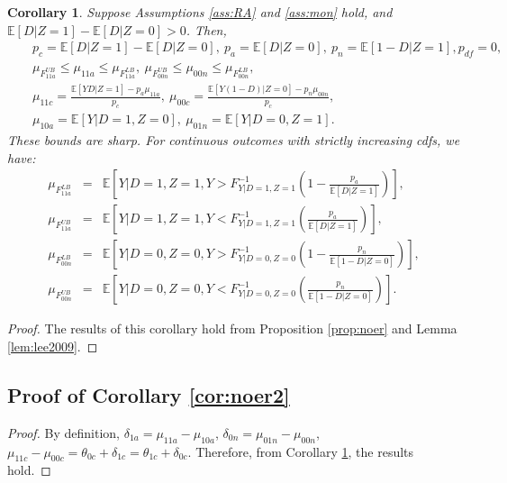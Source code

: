 \documentclass[12pt]{article}
\theoremstyle{plain}
\newtheorem{corollary}{Corollary}%
\theoremstyle{definition}
\theoremstyle{remark}
\begin{document}
\begin{corollary}\label{cor:noer1}
 Suppose Assumptions \ref{ass:RA} and \ref{ass:mon} hold, and $\mathbb{E}[D  \vert  Z=1] - \mathbb{E}[D  \vert  Z=0]> 0$. Then,
\begin{eqnarray*}
    && p_c=\mathbb{E}[D  \vert  Z=1] - \mathbb{E}[D  \vert  Z=0],\ p_a=\mathbb E[D\vert Z=0],\ p_n=\mathbb E[1-D\vert Z=1], p_{df}=0,\\
    && \mu_{F_{11a}^{UB}} \leq \mu_{11a} \leq \mu_{F_{11a}^{LB}},\ \mu_{F_{00n}^{UB}} \leq \mu_{00n} \leq \mu_{F_{00n}^{LB}},\\
    && \mu_{11c} = \frac{\mathbb E[Y D \vert Z=1]- p_a \mu_{11a}}{p_c},\  \mu_{00c} = \frac{\mathbb E[Y (1-D) \vert Z=0]- p_n \mu_{00n}}{p_c},\\
    && \mu_{10a}=\mathbb E[Y \vert D=1, Z=0],\ \mu_{01n}=\mathbb E[Y \vert D=0, Z=1]. 
\end{eqnarray*}   
These bounds are sharp. 
For continuous outcomes with strictly increasing cdfs, we have: 
\begin{eqnarray*}
\mu_{F_{11a}^{LB}} &=& \mathbb E\left[Y\vert D=1, Z=1, Y> F^{-1}_{Y\vert D=1, Z=1}\left(1-\frac{p_a}{\mathbb E[D\vert Z=1]}\right)\right],\\
\mu_{F_{11a}^{UB}} &=& \mathbb E\left[Y\vert D=1, Z=1, Y< F^{-1}_{Y\vert D=1, Z=1}\left(\frac{p_a}{\mathbb E[D\vert Z=1]}\right)\right],\\
\mu_{F_{00n}^{LB}} &=& \mathbb E\left[Y\vert D=0, Z=0, Y> F^{-1}_{Y\vert D=0, Z=0}\left(1-\frac{p_{n}}{\mathbb E[1-D\vert Z=0]}\right)\right],\\
\mu_{F_{00n}^{UB}} &=& \mathbb E\left[Y\vert D=0, Z=0, Y< F^{-1}_{Y\vert D=0, Z=0}\left(\frac{p_{n}}{\mathbb E[1-D\vert Z=0]}\right)\right].
\end{eqnarray*}
\end{corollary}

\begin{proof}
    The results of this corollary hold from Proposition \ref{prop:noer} and Lemma \ref{lem:lee2009}. 
\end{proof}

\subsection{Proof of Corollary \ref{cor:noer2}}

\begin{proof}
   By definition, $\delta_{1a}=\mu_{11a}-\mu_{10a}$, $\delta_{0n}=\mu_{01n}-\mu_{00n}$, $\mu_{11c}-\mu_{00c}=\theta_{0c}+\delta_{1c}=\theta_{1c}+\delta_{0c}$. Therefore, from Corollary \ref{cor:noer1}, the results hold. 
\end{proof}
\end{document}
